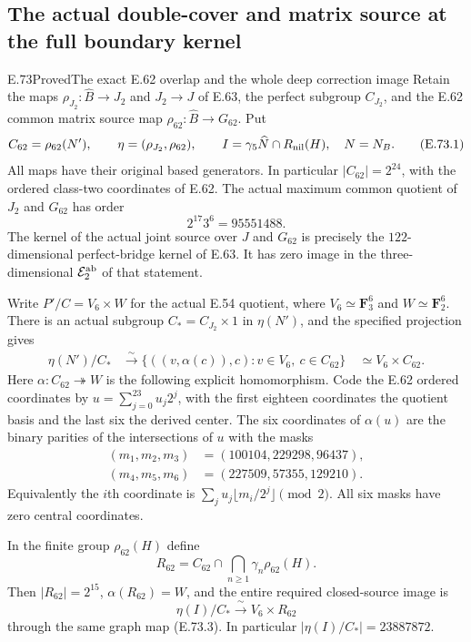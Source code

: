 \subsection{The actual double-cover and matrix source at the full boundary kernel}

\begin{statement}{E.73}{Proved}{The exact E.62 overlap and the whole deep correction image}
Retain the maps $\rho_{J_2}:\widehat B\to J_2$ and
$J_2\to J$ of E.63, the perfect subgroup $C_{J_2}$,
and the E.62 common matrix source map
$\rho_{62}:\widehat B\to G_{62}$. Put
\[
 C_{62}=\rho_{62}(N'),\qquad
 \eta=(\rho_{J_2},\rho_{62}),\qquad
 I=\gamma_5\widehat N\cap R_{\rm nil}(H),
 \quad N=N_B.
 \tag{E.73.1}
\]
All maps have their original based generators. In particular
$|C_{62}|=2^{24}$, with the ordered class-two coordinates of
E.62. The actual maximum common quotient of $J_2$ and $G_{62}$
has order
\[
                         2^{17}3^6=95551488.
 \tag{E.73.2}
\]
The kernel of the actual joint source over $J$ and $G_{62}$
is precisely the $122$-dimensional perfect-bridge kernel of
E.63. It has zero image in the three-dimensional
$\mathcal E_2^{\rm ab}$ of that statement.

Write $P'/C=V_6\times W$ for the actual E.54 quotient,
where $V_6\simeq\mathbf F_3^6$ and $W\simeq\mathbf F_2^6$.
There is an actual subgroup $C_*=C_{J_2}\times1$ in
$\eta(N')$, and the specified projection gives
\[
 \begin{aligned}
 \eta(N')/C_*&\xrightarrow{\ \sim\ }
 \{((v,\alpha(c)),c):v\in V_6,\ c\in C_{62}\}\
 &\simeq V_6\times C_{62}.
 \end{aligned}
 \tag{E.73.3}
\]
Here $\alpha:C_{62}\twoheadrightarrow W$ is the following
explicit homomorphism. Code the E.62 ordered coordinates by
$u=\sum_{j=0}^{23}u_j2^j$, with the first eighteen coordinates
the quotient basis and the last six the derived center.
The six coordinates of $\alpha(u)$ are the binary parities
of the intersections of $u$ with the masks
\[
 \begin{split}
 (m_1,m_2,m_3)&=(100104,229298,96437),\\
 (m_4,m_5,m_6)&=(227509,57355,129210).
 \end{split}
 \tag{E.73.4}
\]
Equivalently the $i$th coordinate is
$\sum_j u_j\lfloor m_i/2^j\rfloor\pmod2$.
All six masks have zero central coordinates.

In the finite group $\rho_{62}(H)$ define
\[
 R_{62}=C_{62}\cap\bigcap_{n\ge1}\gamma_n\rho_{62}(H).
 \tag{E.73.5}
\]
Then $|R_{62}|=2^{15}$, $\alpha(R_{62})=W$, and the
entire required closed-source image is
\[
                 \eta(I)/C_*
                   \xrightarrow{\ \sim\ }V_6\times R_{62}
 \tag{E.73.6}
\]
through the same graph map (E.73.3). In particular
$|\eta(I)/C_*|=23887872$.


\end{statement}
